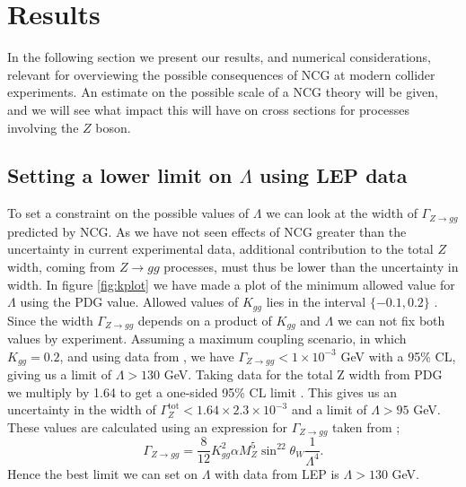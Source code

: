 \section{Results}
In the following section we present our results, and numerical considerations, relevant for overviewing the possible consequences of NCG at modern collider experiments. An estimate on the possible scale of a NCG theory will be given, and we will see what impact this will have on cross sections for processes involving the $Z$ boson.

\subsection{Setting a lower limit on $\Lambda$ using LEP data}
To set a constraint on the possible values of $\Lambda$ we can look at the width of $\Gamma_{Z \rightarrow gg}$ predicted by NCG. As we have not seen effects of NCG greater than the uncertainty in current experimental data, additional contribution to the total $Z$ width, coming from $Z \rightarrow gg$ processes, must thus be lower than the uncertainty in width. In figure \ref{fig:kplot} we have made a plot of the minimum allowed value for $\Lambda$ using the PDG value. Allowed values of $K_{gg}$ lies in the interval $\{-0.1,0.2\}$ \cite{behr2003dnc}. Since the width $\Gamma_{Z \rightarrow gg}$ depends on a product of $K_{gg}$ and $\Lambda$ we can not fix both values by experiment. Assuming a maximum coupling scenario, in which $K_{gg}=0.2$, and using data from \cite{behr2003dnc}, we have $\Gamma_{Z \rightarrow gg} < 1 \times 10^{-3}$ GeV with a 95\% CL, giving us a limit of $\Lambda > 130$ GeV. Taking data for the total Z width from PDG we multiply by 1.64 to get a one-sided 95\% CL limit \cite{amsler2008rpp}. This gives us an uncertainty in the width of $\Gamma_{Z}^\textrm{tot} < 1.64 \times 2.3 \times 10^{-3}$ and a limit of $\Lambda > 95$ GeV. These values are calculated using an expression for $\Gamma_{Z \rightarrow gg}$ taken from \cite{behr2003dnc};
\begin{equation} \label{eq:zggwidth}
	\Gamma_{Z \rightarrow gg} = \frac{8}{12} K_{gg}^2 \alpha M_Z^5 \sin^22\theta_W \frac{1}{\Lambda^4}.
\end{equation}
Hence the best limit we can set on $\Lambda$ with data from LEP is $\Lambda > 130$ GeV.


